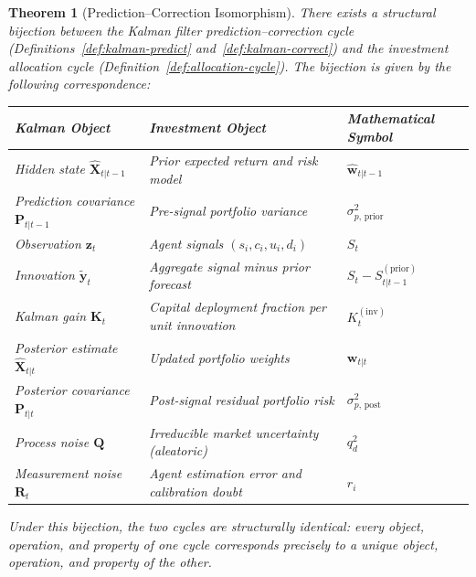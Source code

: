\documentclass[12pt,openany]{book}
\numberwithin{equation}{chapter}
\theoremstyle{plain}
\newtheorem{theorem}{Theorem}[chapter]
\theoremstyle{definition}
\theoremstyle{remark}
\begin{document}
\begin{theorem}[Prediction--Correction Isomorphism]
\label{thm:isomorphism}
There exists a structural bijection between the Kalman filter
prediction--correction cycle (Definitions~\ref{def:kalman-predict}
and~\ref{def:kalman-correct}) and the investment allocation cycle
(Definition~\ref{def:allocation-cycle}).  The bijection is given
by the following correspondence:

\begin{center}
\begin{tabularx}{\textwidth}{@{} p{5.5cm} X p{3.8cm} @{}}
\toprule
\textbf{Kalman Object} & \textbf{Investment Object}
  & \textbf{Mathematical Symbol} \\
\midrule
Hidden state $\hat{\mathbf{X}}_{t|t-1}$
  & Prior expected return and risk model
  & $\hat{\mathbf{w}}_{t|t-1}$ \\
Prediction covariance $\mathbf{P}_{t|t-1}$
  & Pre-signal portfolio variance
  & $\sigma_{p,\,\text{prior}}^2$ \\
Observation $\mathbf{z}_t$
  & Agent signals $(s_i, c_i, u_i, d_i)$
  & $S_t$ \\
Innovation $\tilde{\mathbf{y}}_t$
  & Aggregate signal minus prior forecast
  & $S_t - S_{t|t-1}^{(\mathrm{prior})}$ \\
Kalman gain $\mathbf{K}_t$
  & Capital deployment fraction per unit innovation
  & $K_t^{(\mathrm{inv})}$ \\
Posterior estimate $\hat{\mathbf{X}}_{t|t}$
  & Updated portfolio weights
  & $\mathbf{w}_{t|t}$ \\
Posterior covariance $\mathbf{P}_{t|t}$
  & Post-signal residual portfolio risk
  & $\sigma_{p,\,\text{post}}^2$ \\
Process noise $\mathbf{Q}$
  & Irreducible market uncertainty (aleatoric)
  & $q_d^2$ \\
Measurement noise $\mathbf{R}_t$
  & Agent estimation error and calibration doubt
  & $r_i$ \\
\bottomrule
\end{tabularx}
\end{center}

Under this bijection, the two cycles are structurally identical:
every object, operation, and property of one cycle corresponds
precisely to a unique object, operation, and property of the other.
\end{theorem}
\end{document}
